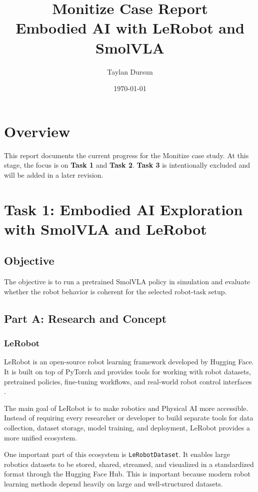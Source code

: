 \documentclass[11pt,a4paper]{article}
\title{Monitize Case Report\\\large Embodied AI with LeRobot and SmolVLA}
\author{Taylan Dursun}
\date{\today}
\begin{document}
\maketitle
\tableofcontents
\newpage

\section{Overview}
This report documents the current progress for the Monitize case study.
At this stage, the focus is on \textbf{Task 1} and \textbf{Task 2}.
\textbf{Task 3} is intentionally excluded and will be added in a later revision.

\section{Task 1: Embodied AI Exploration with SmolVLA and LeRobot}

\subsection{Objective}
The objective is to run a pretrained SmolVLA policy in simulation and evaluate whether the robot behavior is coherent for the selected robot-task setup.

\subsection{Part A: Research and Concept}

\subsubsection{LeRobot}

LeRobot is an open-source robot learning framework developed by Hugging Face. It is built on top of PyTorch and provides tools for working with robot datasets, pretrained policies, fine-tuning workflows, and real-world robot control interfaces \cite{lerobot_github}.

The main goal of LeRobot is to make robotics and Physical AI more accessible. Instead of requiring every researcher or developer to build separate tools for data collection, dataset storage, model training, and deployment, LeRobot provides a more unified ecosystem.

One important part of this ecosystem is \texttt{LeRobotDataset}. It enables large robotics datasets to be stored, shared, streamed, and visualized in a standardized format through the Hugging Face Hub. This is important because modern robot learning methods depend heavily on large and well-structured datasets.
\end{document}
